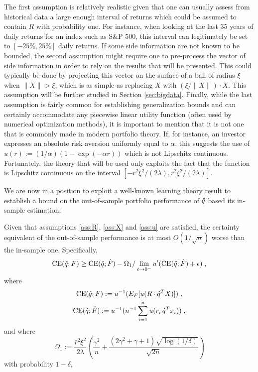 The first assumption is relatively realistic given that one can usually assess from
historical data a large enough interval of returns which could be assumed to contain $R$
with probability one. For instance, when looking at the last 35 years of daily returns for
an index such as S\&P 500, this interval can legitimately be set to $[-25\% , 25\%]$ daily
returns. If some side information are not known to be bounded, the second assumption might
require one to pre-process the vector of side information in order to rely on the results
that will be presented. This could typically be done by projecting this vector on the
surface of a ball of radius $\xi$ when $\|X\|>\xi$, which is as simple as replacing $X$
with $(\xi/\|X\|)\cdot X$. This assumption will be further studied in Section
\ref{sec:bigdata}. Finally, while the last assumption is fairly common for establishing
generalization bounds and can certainly accommodate any piecewise linear utility function
(often used by numerical optimization methods), it is important to mention that it is not
one that is commonly made in modern portfolio theory. If, for instance, an investor
expresses an absolute risk aversion uniformly equal to $\alpha$, this suggests the use of
$u(r):=(1/\alpha)(1-\exp(-\alpha r))$ which is not Lipschitz continuous. Fortunately, the
theory that will be used only exploits the fact that the function is Lipschitz continuous
on the interval $[-\bar{r}^2\xi^2/(2\lambda), \bar{r}^2\xi^2/(2\lambda)]$.


We are now in a position to exploit a well-known learning theory result to establish a
bound on the out-of-sample portfolio performance of ${\hat{q}}$ based its in-sample
estimation:
\begin{thm}\label{thm:outsampleBound1}
  Given that assumptions \ref{ass:R}, \ref{ass:X} and \ref{ass:u} are satisfied, the
  certainty equivalent of the out-of-sample performance is at most $O(1/\sqrt{n})$ worse
  than the in-sample one. Specifically,
  \[ 
    \operatorname{CE}({\hat{q}};F) \geq \operatorname{CE}({\hat{q}};{\hat{F}}) -
    \Omega_1/\lim_{\epsilon\to0^-}u'(\operatorname{CE}({\hat{q}};{\hat{F}})+\epsilon)\;,
  \]
  where
  \begin{gather*}
    \operatorname{CE}({\hat{q}};F):=u^{-1}(E_F[u(R\cdot{\hat{q}}^T X)])\;,\\
    \operatorname{CE}({\hat{q}};{\hat{F}}):=u^{-1}(n^{-1}\sum_{i=1}^n u(r_i\,{\hat{q}}^T x_i))\;,
  \end{gather*}
  and where
  \[
    \Omega_1 := \frac{\bar{r}^2 \xi^2}{2\lambda} \left(\frac{\gamma^2}{n} +
      \frac{(2\gamma^2+\gamma+1)\sqrt{\log(1/\delta)}}{\sqrt{2n}}\right)
  \] 
  with probability $1-\delta$,
\end{thm}

